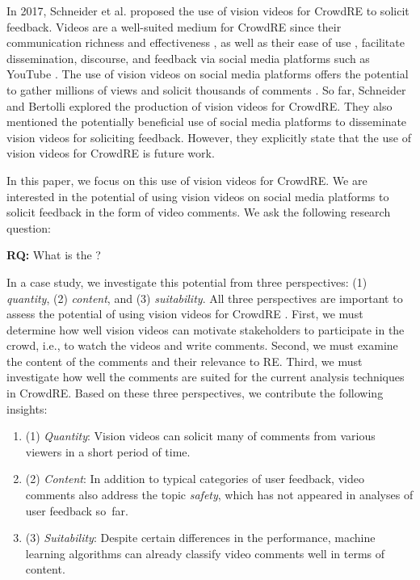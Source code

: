 \documentclass[conference]{IEEEtran}
\begin{document}
In 2017, Schneider et al. \cite{Schneider.2017} proposed the use of vision videos for CrowdRE to solicit feedback. Videos are a well-suited medium for CrowdRE since their communication richness and effectiveness \cite{Ambler.2002, Karras.2018, Karras.2017}, as well as their ease of use \cite{Karras.2017a, Karras.2018b, Karras.2016}, facilitate dissemination, discourse, and feedback via social media platforms such as YouTube \cite{Schneider.2017, Vistisen.2017, Schneider.2019a}. The use of vision videos on social media platforms offers the potential to gather millions of views and solicit thousands of comments \cite{Vistisen.2017}. So far, Schneider and Bertolli \cite{Schneider.2019a} explored the production of vision videos for CrowdRE. They also mentioned the potentially beneficial use of social media platforms to disseminate vision videos for soliciting feedback. However, they explicitly state that the use of vision videos for CrowdRE is future work.

In this paper, we focus on this use of vision videos for CrowdRE. We are interested in the potential of using vision videos on social media platforms to solicit feedback in the form of video comments. We ask the following research question:

\begin{mdframed}
	\textbf{RQ:} What is the ?
\end{mdframed}

In a case study, we investigate this potential from three perspectives: (1) \textit{quantity}, (2) \textit{content}, and (3) \textit{suitability}. All three perspectives are important to assess the potential of using vision videos for CrowdRE \cite{Khan.2019}. First, we must determine how well vision videos can motivate stakeholders to participate in the crowd, i.e., to watch the videos and write comments. Second, we must examine the content of the comments and their relevance to RE. Third, we must investigate how well the comments are suited for the current analysis techniques in CrowdRE. Based on these three perspectives, we contribute the following insights:

\begin{mdframed}
	\begin{enumerate}[leftmargin=0cm]
		\item[] (1) \textit{Quantity}: Vision videos can solicit many of comments from various viewers in a short period of time.
		
		\item[] (2) \textit{Content}: In addition to typical categories of user feedback, video comments also address the topic \textit{safety}, which has not appeared in analyses of user feedback so~far.
		
		\item[] (3) \textit{Suitability}: Despite certain differences in the performance, machine learning algorithms can already classify video comments well in terms of content.
	\end{enumerate}
\end{mdframed}
\end{document}
